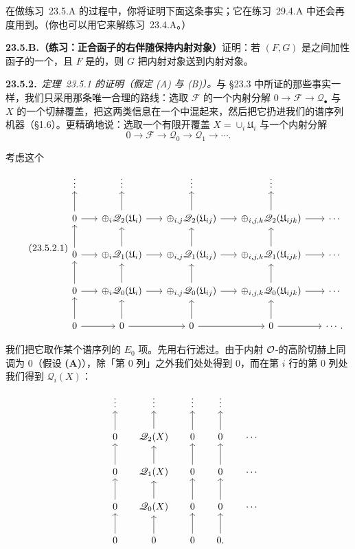 在做\mbox{练习~23.5.A} 的过程中，你将证明下面这条事实；它在\mbox{练习~29.4.A} 中还会再度用到。（你也可以用它来解\mbox{练习~23.4.A}。）

\textbf{23.5.B.（练习：正合函子的右伴随保持内射对象）}\quad 证明：若 $(F,G)$ 是\trAbelianCategory{}之间加性函子的一个\trAdjointPair，且 $F$ 是\trExact{}的，则 $G$ 把内射对象送到内射对象。

\textbf{23.5.2.}\ \emph{\mbox{定理~23.5.1} 的证明（假定 (A) 与 (B)）。}\quad 与 \S23.3 中所证的那些事实一样，我们只采用那条唯一合理的路线：选取 $\mathscr{F}$ 的一个内射分解 $0\to\mathscr{F}\to\mathscr{Q}_\bullet$ 与 $X$ 的一个切赫覆盖，把这两类信息在一个\trDoubleComplex{}中混起来，然后把它扔进我们的谱序列机器（\S1.6）。更精确地说：选取一个有限\trAffine{}开覆盖 $X=\cup_i\mathfrak{U}_i$ 与一个内射分解
\[
0 \longrightarrow \mathscr{F} \longrightarrow \mathscr{Q}_0 \longrightarrow \mathscr{Q}_1 \longrightarrow \cdots.
\]

考虑这个\trDoubleComplex
\begin{equation*}\tag{23.5.2.1}\label{eq:agree-double}
\begin{tikzcd}[row sep=2em, column sep=1.7em]
\vdots & \vdots & \vdots & \vdots & \\
0 \ar[r] \ar[u] & \oplus_i\mathscr{Q}_2(\mathfrak{U}_i) \ar[r] \ar[u] & \oplus_{i,j}\mathscr{Q}_2(\mathfrak{U}_{ij}) \ar[r] \ar[u] & \oplus_{i,j,k}\mathscr{Q}_2(\mathfrak{U}_{ijk}) \ar[r] \ar[u] & \cdots \\
0 \ar[r] \ar[u] & \oplus_i\mathscr{Q}_1(\mathfrak{U}_i) \ar[r] \ar[u] & \oplus_{i,j}\mathscr{Q}_1(\mathfrak{U}_{ij}) \ar[r] \ar[u] & \oplus_{i,j,k}\mathscr{Q}_1(\mathfrak{U}_{ijk}) \ar[r] \ar[u] & \cdots \\
0 \ar[r] \ar[u] & \oplus_i\mathscr{Q}_0(\mathfrak{U}_i) \ar[r] \ar[u] & \oplus_{i,j}\mathscr{Q}_0(\mathfrak{U}_{ij}) \ar[r] \ar[u] & \oplus_{i,j,k}\mathscr{Q}_0(\mathfrak{U}_{ijk}) \ar[r] \ar[u] & \cdots \\
0 \ar[r] \ar[u] & 0 \ar[r] \ar[u] & 0 \ar[r] \ar[u] & 0 \ar[r] \ar[u] & \cdots.
\end{tikzcd}
\end{equation*}

我们把它取作某个谱序列的 $E_0$ 项。先用右行滤过。由于内射 $\mathcal{O}$-\trModule{}的高阶切赫上同调为 $0$（假设 \textbf{(A)}），除「第 $0$ 列」之外我们处处得到 $0$，而在第 $i$ 行的第 $0$ 列处我们得到 $\mathscr{Q}_i(X)$：
\[
\begin{tikzcd}[row sep=1.9em, column sep=1.4em]
 & \vdots & \vdots & \vdots & \vdots & \\
 & 0 \ar[u] & \mathscr{Q}_2(X) \ar[u] & 0 \ar[u] & 0 \ar[u] & \cdots \\
 & 0 \ar[u] & \mathscr{Q}_1(X) \ar[u] & 0 \ar[u] & 0 \ar[u] & \cdots \\
 & 0 \ar[u] & \mathscr{Q}_0(X) \ar[u] & 0 \ar[u] & 0 \ar[u] & \cdots \\
 & 0 \ar[u] & 0 \ar[u] & 0 \ar[u] & 0. \ar[u] &
\end{tikzcd}
\]

